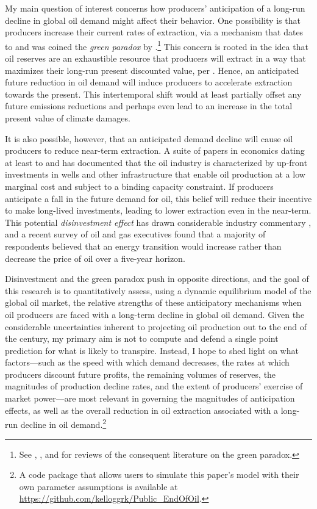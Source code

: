 \documentclass[12pt]{article}
\begin{document}
My main question of interest concerns how producers' anticipation of a long-run decline in global oil demand might affect their behavior. One possibility is that producers increase their current rates of extraction, via a mechanism that dates to \cite{sinclair1992} and was coined the \emph{green paradox} by \cite{sinn2008}.\footnote{See \cite{pittelbook2014}, \cite{jensenetal2015}, and \cite{vanderPloegWhithagen2015} for reviews of the consequent literature on the green paradox.} This concern is rooted in the idea that oil reserves are an exhaustible resource that producers will extract in a way that maximizes their long-run present discounted value, per \cite{Hotelling1931}. Hence, an anticipated future reduction in oil demand will induce producers to accelerate extraction towards the present. This intertemporal shift would at least partially offset any future emissions reductions and perhaps even lead to an increase in the total present value of climate damages.

It is also possible, however, that an anticipated demand decline will cause oil producers to reduce near-term extraction. A suite of papers in economics dating at least to \cite{nystad1987} and \cite{adelman1990} has documented that the oil industry is characterized by up-front investments in wells and other infrastructure that enable oil production at a low marginal cost and subject to a binding capacity constraint. If producers anticipate a fall in the future demand for oil, this belief will reduce their incentive to make long-lived investments, leading to lower extraction even in the near-term. This potential \emph{disinvestment effect} has drawn considerable industry commentary \citep{nrgi2021,jainpalacios2023,WSJ_climateinvestment2023,Barrons2023}, and a recent survey of oil and gas executives \citep{dallasfed} found that a majority of respondents believed that an energy transition would increase rather than decrease the price of oil over a five-year horizon. 

Disinvestment and the green paradox push in opposite directions, and the goal of this research is to quantitatively assess, using a dynamic equilibrium model of the global oil market, the relative strengths of these anticipatory mechanisms when oil producers are faced with a long-term decline in global oil demand. Given the considerable uncertainties inherent to projecting oil production out to the end of the century, my primary aim is not to compute and defend a single point prediction for what is likely to transpire. Instead, I hope to shed light on what factors---such as the speed with which demand decreases, the rates at which producers discount future profits, the remaining volumes of reserves, the magnitudes of production decline rates, and the extent of producers' exercise of market power---are most relevant in governing the magnitudes of anticipation effects, as well as the overall reduction in oil extraction associated with a long-run decline in oil demand.\footnote{A code package that allows users to simulate this paper's model with their own parameter assumptions is available at \url{https://github.com/kelloggrk/Public_EndOfOil}.}
\end{document}
